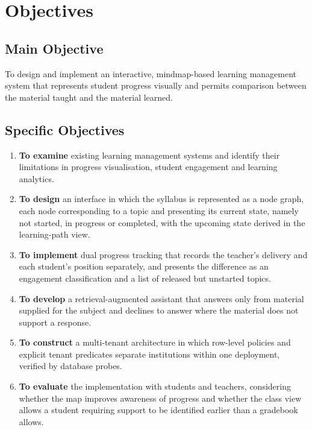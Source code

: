 \chapter{Objectives}
\label{Objectives}

\section{Main Objective}

To design and implement an interactive, mindmap-based learning management system that represents student progress visually and permits comparison between the material taught and the material learned.

\section{Specific Objectives}

\begin{enumerate}
    \item \textbf{To examine} existing learning management systems and identify their limitations in progress visualisation, student engagement and learning analytics.

    \item \textbf{To design} an interface in which the syllabus is represented as a node graph, each node corresponding to a topic and presenting its current state, namely not started, in progress or completed, with the upcoming state derived in the learning-path view.

    \item \textbf{To implement} dual progress tracking that records the teacher's delivery and each student's position separately, and presents the difference as an engagement classification and a list of released but unstarted topics.

    \item \textbf{To develop} a retrieval-augmented assistant that answers only from material supplied for the subject and declines to answer where the material does not support a response.

    \item \textbf{To construct} a multi-tenant architecture in which row-level policies and explicit tenant predicates separate institutions within one deployment, verified by database probes.

    \item \textbf{To evaluate} the implementation with students and teachers, considering whether the map improves awareness of progress and whether the class view allows a student requiring support to be identified earlier than a gradebook allows.
\end{enumerate}
